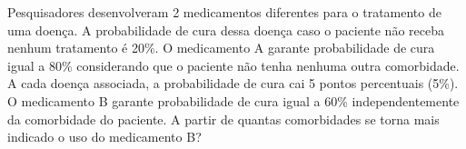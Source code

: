 %
%


\begin{exercicioBanco}[\valorquestao]

Pesquisadores desenvolveram 2 medicamentos diferentes para o tratamento de uma doença. A probabilidade de cura dessa doença caso o paciente não receba nenhum tratamento é 20\%. O medicamento A garante probabilidade de cura igual a 80\% considerando que o paciente não tenha nenhuma outra comorbidade. A cada doença associada, a probabilidade de cura cai 5 pontos percentuais (5\%). O medicamento B garante probabilidade de cura igual a 60\% independentemente da comorbidade do paciente. A partir de quantas comorbidades se torna mais indicado o uso do medicamento B?

\end{exercicioBanco}


